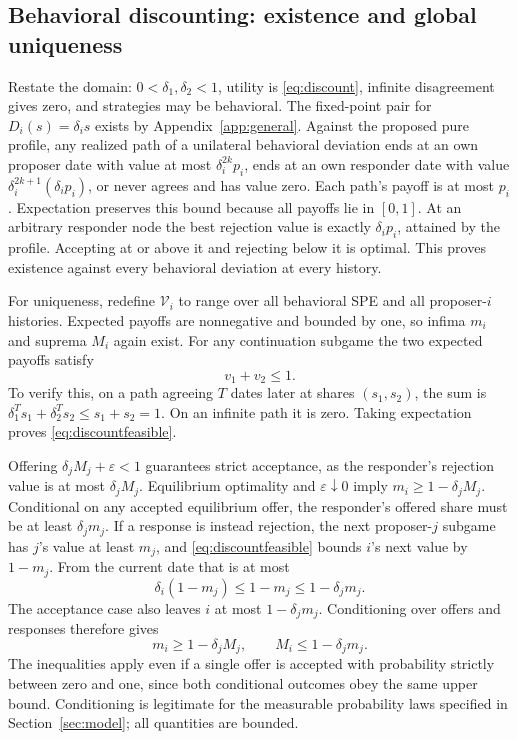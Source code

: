 \documentclass[11pt]{article}
\begin{document}
\subsection{Behavioral discounting: existence and global uniqueness}\label{app:discount}
Restate the domain: $0<\delta_1,\delta_2<1$, utility is \eqref{eq:discount}, infinite disagreement gives zero, and strategies may be behavioral. The fixed-point pair for $D_i(s)=\delta_i s$ exists by Appendix~\ref{app:general}. Against the proposed pure profile, any realized path of a unilateral behavioral deviation ends at an own proposer date with value at most $\delta_i^{2k}p_i$, ends at an own responder date with value $\delta_i^{2k+1}(\delta_i p_i)$, or never agrees and has value zero. Each path's payoff is at most $p_i$. Expectation preserves this bound because all payoffs lie in $[0,1]$. At an arbitrary responder node the best rejection value is exactly $\delta_i p_i$, attained by the profile. Accepting at or above it and rejecting below it is optimal. This proves existence against every behavioral deviation at every history.

For uniqueness, redefine $\mathcal V_i$ to range over all behavioral SPE and all proposer-$i$ histories. Expected payoffs are nonnegative and bounded by one, so infima $m_i$ and suprema $M_i$ again exist. For any continuation subgame the two expected payoffs satisfy
\begin{equation}\label{eq:discountfeasible}
 v_1+v_2\le1.
\end{equation}
To verify this, on a path agreeing $T$ dates later at shares $(s_1,s_2)$, the sum is $\delta_1^T s_1+\delta_2^T s_2\le s_1+s_2=1$. On an infinite path it is zero. Taking expectation proves \eqref{eq:discountfeasible}.

Offering $\delta_jM_j+\varepsilon<1$ guarantees strict acceptance, as the responder's rejection value is at most $\delta_jM_j$. Equilibrium optimality and $\varepsilon\downarrow0$ imply $m_i\ge1-\delta_jM_j$. Conditional on any accepted equilibrium offer, the responder's offered share must be at least $\delta_jm_j$. If a response is instead rejection, the next proposer-$j$ subgame has $j$'s value at least $m_j$, and \eqref{eq:discountfeasible} bounds $i$'s next value by $1-m_j$. From the current date that is at most
\begin{equation}
 \delta_i(1-m_j)\le1-m_j\le1-\delta_jm_j.
\end{equation}
The acceptance case also leaves $i$ at most $1-\delta_jm_j$. Conditioning over offers and responses therefore gives
\begin{equation}\label{eq:disc-envelope}
 m_i\ge1-\delta_jM_j,\qquad M_i\le1-\delta_jm_j.
\end{equation}
The inequalities apply even if a single offer is accepted with probability strictly between zero and one, since both conditional outcomes obey the same upper bound. Conditioning is legitimate for the measurable probability laws specified in Section~\ref{sec:model}; all quantities are bounded.
\end{document}
